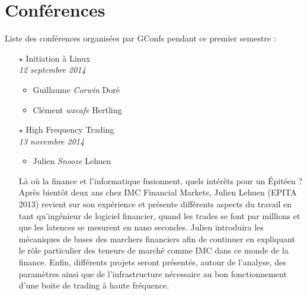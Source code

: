 \documentclass[a4paper]{article}
\title{\mytitle}
\author{toogy}
\begin{document}
\maketitle

\section{Conférences}

Liste des conférences organisées par GConfs pendant ce premier semestre :\\

\begin{itemize}
    \item[$\star$] Initiation à Linux\\
        \emph{12 septembre 2014}
        \begin{itemize}
            \item Guillaume \emph{Corwin} Doré
            \item Clément \emph{wxcafe} Hertling
        \end{itemize}

        \vspace{0.3cm}

    \item[$\star$] High Frequency Trading\\
        \emph{13 novembre 2014}
        \begin{itemize}
            \item Julien \emph{Snooze} Lehuen
        \end{itemize}

        Là où la finance et l'informatique fusionnent, quels intérêts pour un
        Épitéen ? Après bientôt deux ans chez IMC Financial Markets, Julien
        Lehuen (EPITA 2013) revient sur son expérience et présente différents
        aspects du travail en tant qu'ingénieur de logiciel financier, quand
        les trades se font par millions et que les latences se mesurent en nano
        secondes. Julien introduira les mécaniques de bases des marchers
        financiers afin de continuer en expliquant le rôle particulier des
        teneurs de marché comme IMC dans ce monde de la finance. Enfin,
        différents projets seront présentés, autour de l'analyse, des
        paramètres ainsi que de l'infrastructure nécessaire au bon
        fonctionnement d'une boite de trading à haute fréquence.

        \vspace{0.3cm}


\end{itemize}
\end{document}
